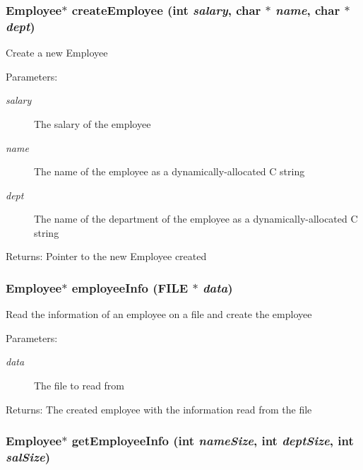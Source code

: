 \subsubsection{\setlength{\rightskip}{0pt plus 5cm}\bf{Employee}$\ast$ create\-Employee (int {\em salary}, char $\ast$ {\em name}, char $\ast$ {\em dept})}\label{struct_8c_b14bf26660b983276c2788be527dd90d}


Create a new Employee \begin{Desc}
\item[Parameters:]
\begin{description}
\item[{\em salary}]The salary of the employee \item[{\em name}]The name of the employee as a dynamically-allocated C string \item[{\em dept}]The name of the department of the employee as a dynamically-allocated C string \end{description}
\end{Desc}
\begin{Desc}
\item[Returns:]Pointer to the new Employee created \end{Desc}
\subsubsection{\setlength{\rightskip}{0pt plus 5cm}\bf{Employee}$\ast$ employee\-Info (FILE $\ast$ {\em data})}\label{struct_8c_d1dec782f287f497cd0aa38952408134}


Read the information of an employee on a file and create the employee \begin{Desc}
\item[Parameters:]
\begin{description}
\item[{\em data}]The file to read from \end{description}
\end{Desc}
\begin{Desc}
\item[Returns:]The created employee with the information read from the file \end{Desc}
\subsubsection{\setlength{\rightskip}{0pt plus 5cm}\bf{Employee}$\ast$ get\-Employee\-Info (int {\em name\-Size}, int {\em dept\-Size}, int {\em sal\-Size})}\label{struct_8c_88c3438b462401d8f0849705bb085823}


